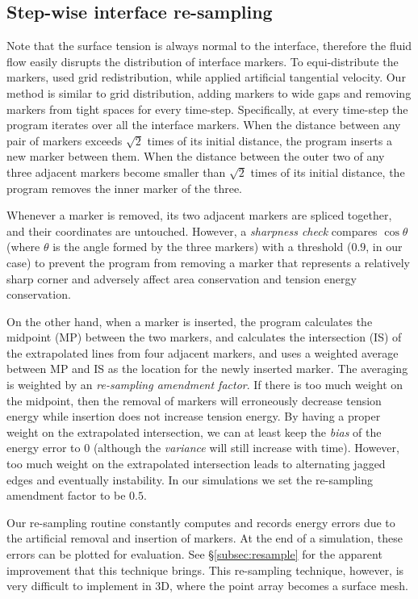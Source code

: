 \documentclass{jfm}
\begin{document}
\subsection{Step-wise interface re-sampling}
Note that the surface tension is always normal to the interface, therefore the fluid flow easily disrupts the distribution of interface markers. To equi-distribute the markers, \cite{lai2008immersed} used grid redistribution, while \cite{hou1994removing, MCL_IBM_surfactant} applied artificial tangential velocity. Our method is similar to grid distribution, adding markers to wide gaps and removing markers from tight spaces for every time-step. Specifically, at every time-step the program iterates over all the interface markers. When the distance between any pair of markers exceeds $\sqrt{2}$ times of its initial distance, the program inserts a new marker between them. When the distance between the outer two of any three adjacent markers become smaller than $\sqrt{2}$ times of its initial distance, the program removes the inner marker of the three. 

Whenever a marker is removed, its two adjacent markers are spliced together, and their coordinates are untouched. However, a \textit{sharpness check} compares $\cos \theta$ (where $\theta$ is the angle formed by the three markers) with a threshold ($0.9$, in our case) to prevent the program from removing a marker that represents a relatively sharp corner and adversely affect area conservation and tension energy conservation. 

On the other hand, when a marker is inserted, the program calculates the midpoint (MP) between the two markers, and calculates the intersection (IS) of the extrapolated lines from four adjacent markers, and uses a weighted average between MP and IS as the location for the newly inserted marker. The averaging is weighted by an \textit{re-sampling amendment factor}. If there is too much weight on the midpoint, then the removal of markers will erroneously decrease tension energy while insertion does not increase tension energy. By having a proper weight on the extrapolated intersection, we can at least keep the \textit{bias} of the energy error to $0$ (although the \textit{variance} will still increase with time). However, too much weight on the extrapolated intersection leads to alternating jagged edges and eventually instability. In our simulations we set the re-sampling amendment factor to be $0.5$. 

Our re-sampling routine constantly computes and records energy errors due to the artificial removal and insertion of markers. At the end of a simulation, these errors can be plotted for evaluation. See \S\ref{subsec:resample} for the apparent improvement that this technique brings. This re-sampling technique, however, is very difficult to implement in 3D, where the point array becomes a surface mesh.  
\end{document}
